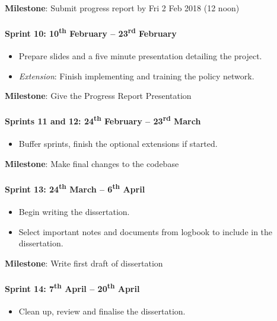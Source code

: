 \documentclass[a4paper]{article}
\begin{document}
\textbf{Milestone}: Submit progress report by Fri 2 Feb 2018 (12 noon)

\paragraph{Sprint 10: 10\textsuperscript{th} February -- 23\textsuperscript{rd} February}
\begin{itemize}
\item Prepare slides and a five minute presentation detailing the project.
\item \textit{Extension}: Finish implementing and training the policy network.
\end{itemize}

\textbf{Milestone}: Give the Progress Report Presentation

\paragraph{Sprints 11 and 12: 24\textsuperscript{th} February -- 23\textsuperscript{rd} March}
\begin{itemize}
\item Buffer sprints, finish the optional extensions if started.
\end{itemize}

\textbf{Milestone}: Make final changes to the codebase

\paragraph{Sprint 13: 24\textsuperscript{th} March -- 6\textsuperscript{th} April}
\begin{itemize}
\item Begin writing the dissertation.
\item Select important notes and documents from logbook to include in the dissertation.
\end{itemize}

\textbf{Milestone}: Write first draft of dissertation

\paragraph{Sprint 14: 7\textsuperscript{th} April -- 20\textsuperscript{th} April}
\begin{itemize}
\item Clean up, review and finalise the dissertation.
\end{itemize}
\end{document}
